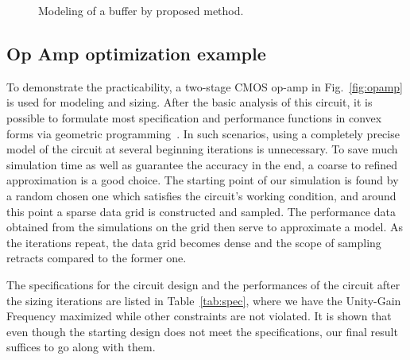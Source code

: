 \documentclass{sig-alternate}
\begin{document}
\begin{figure}[!tb]
\caption{Modeling of a buffer by proposed method.} 
\label{fig:buffer}
\end{figure}


\subsection{Op Amp optimization example}
To demonstrate the practicability, a two-stage CMOS op-amp in
Fig.~\ref{fig:opamp} is used for modeling and sizing. After the basic
analysis of this circuit, it is possible to formulate most
specification and performance functions in convex
forms via geometric programming~\cite{GP_OpAmp}. In such scenarios,
using a completely precise 
model of the circuit at several beginning iterations is
unnecessary. To save much simulation time as well as guarantee the
accuracy in the end, a coarse to refined approximation is a good
choice. The starting point of our simulation is found by a random
chosen one which satisfies the circuit's working condition, and around
this point a sparse data grid is constructed and sampled. The
performance data obtained from the simulations on the grid then serve
to approximate a model. As the iterations repeat, the data grid
becomes dense and the scope of sampling retracts compared to the
former one. 

The specifications for the circuit design
and the performances of the circuit after the sizing iterations are
listed in Table~\ref{tab:spec}, where we have the Unity-Gain Frequency
maximized while other constraints are not violated. It is shown that
even though the starting design does not meet the specifications, our
final result suffices to go along with them.
\end{document}

